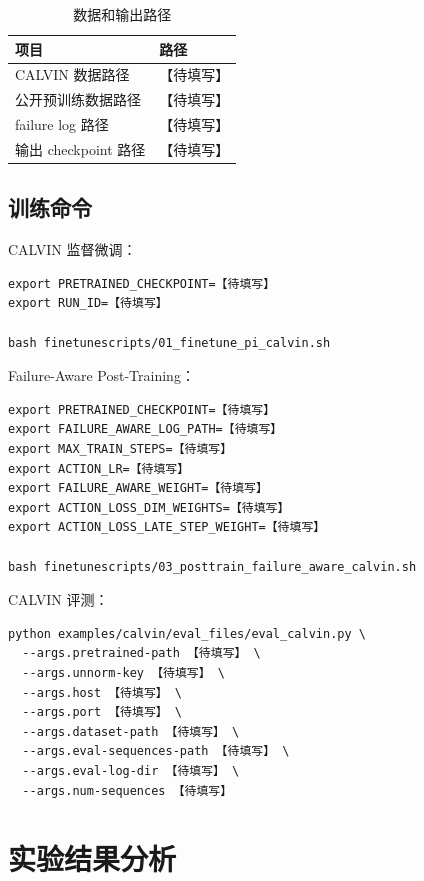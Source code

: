 \documentclass[10pt,a4paper,fontset=none]{ctexart}
\newcommand{\todo}[1]{\textcolor{TodoRed}{【#1】}}
\begin{document}
\begin{table}[H]
\centering
\caption{数据和输出路径}
\begin{tabularx}{0.86\textwidth}{lX}
\toprule
项目 & 路径 \\
\midrule
CALVIN 数据路径 & \todo{待填写} \\
公开预训练数据路径 & \todo{待填写} \\
failure log 路径 & \todo{待填写} \\
输出 checkpoint 路径 & \todo{待填写} \\
\bottomrule
\end{tabularx}
\end{table}

\subsection{训练命令}

CALVIN 监督微调：

\begin{lstlisting}[caption={CALVIN supervised finetuning}]
export PRETRAINED_CHECKPOINT=【待填写】
export RUN_ID=【待填写】

bash finetunescripts/01_finetune_pi_calvin.sh
\end{lstlisting}

Failure-Aware Post-Training：

\begin{lstlisting}[caption={Failure-Aware Post-Training}]
export PRETRAINED_CHECKPOINT=【待填写】
export FAILURE_AWARE_LOG_PATH=【待填写】
export MAX_TRAIN_STEPS=【待填写】
export ACTION_LR=【待填写】
export FAILURE_AWARE_WEIGHT=【待填写】
export ACTION_LOSS_DIM_WEIGHTS=【待填写】
export ACTION_LOSS_LATE_STEP_WEIGHT=【待填写】

bash finetunescripts/03_posttrain_failure_aware_calvin.sh
\end{lstlisting}

CALVIN 评测：

\begin{lstlisting}[caption={CALVIN evaluation}]
python examples/calvin/eval_files/eval_calvin.py \
  --args.pretrained-path 【待填写】 \
  --args.unnorm-key 【待填写】 \
  --args.host 【待填写】 \
  --args.port 【待填写】 \
  --args.dataset-path 【待填写】 \
  --args.eval-sequences-path 【待填写】 \
  --args.eval-log-dir 【待填写】 \
  --args.num-sequences 【待填写】
\end{lstlisting}

\section{实验结果分析}
\end{document}
